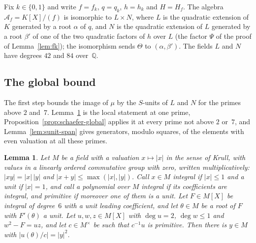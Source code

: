 \documentclass[11pt]{amsart}
\newtheorem{lemma}[theorem]{Lemma}
\theoremstyle{definition}
\numberwithin{equation}{section}
\newcommand{\Q}{\mathbb{Q}}
\newcommand{\lean}[1]{\ignorespaces}
\begin{document}
Fix $k\in\{0,1\}$ and write $f=f_k$, $q=q_k$, $h=h_k$ and $H=H_{f}$. The algebra $\mathcal A_f=K[X]/(f)$ is isomorphic to $L\times N$, where $L$ is the quadratic extension of $K$ generated by a root $\alpha$ of $q$, and $N$ is the quadratic extension of $L$ generated by a root $\beta'$ of one of the two quadratic factors of $h$ over $L$ (the factor $\Psi$ of the proof of Lemma~\ref{lem:fk}); the isomorphism sends $\Theta$ to $(\alpha,\beta')$. The fields $L$ and $N$ have degrees $42$ and $84$ over~$\Q$.

\subsection{The global bound}
The first step bounds the image of $\mu$ by the $S$-units of $L$ and $N$ for the primes above $2$ and~$7$. Lemma~\ref{lem:schaefer-local} is the local statement at one prime, Proposition~\ref{prop:schaefer-global} applies it at every prime not above $2$ or~$7$, and Lemma~\ref{lem:sunit-span} gives generators, modulo squares, of the elements with even valuation at all these primes.

\begin{lemma}\label{lem:schaefer-local}\lean{FurioLombardo.Discharge.SelmerBasis.schaefer_local_sq}
Let $M$ be a field with a valuation $x\mapsto|x|$ in the sense of Krull, with values in a linearly ordered commutative group with zero, written multiplicatively: $|xy|=|x|\,|y|$ and $|x+y|\le\max(|x|,|y|)$. Call $x\in M$ integral if $|x|\le1$ and a unit if $|x|=1$, and call a polynomial over $M$ integral if its coefficients are integral, and primitive if moreover one of them is a unit. Let $F\in M[X]$ be integral of degree~$6$ with a unit leading coefficient, and let $\theta\in M$ be a root of $F$ with $F'(\theta)$ a unit. Let $u,w,z\in M[X]$ with $\deg u=2$, $\deg w\le1$ and $w^2-F=uz$, and let $c\in M^\times$ be such that $c^{-1}u$ is primitive. Then there is $y\in M$ with $|u(\theta)/c|=|y|^2$.
\end{lemma}
\end{document}
